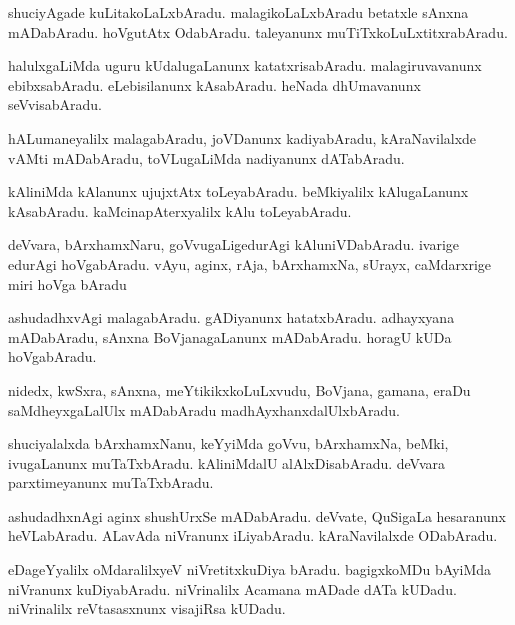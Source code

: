 \documentclass{article}
\begin{document}
\begin{mn}
shuciyAgade kuLitakoLaLxbAradu. malagikoLaLxbAradu betatxle sAnxna mADabAradu. hoVgutAtx 
OdabAradu. taleyanunx muTiTxkoLuLxtitxrabAradu.
\end{mn}

\begin{mn}
halulxgaLiMda uguru kUdalugaLanunx katatxrisabAradu. malagiruvavanunx ebibxsabAradu. 
eLebisilanunx kAsabAradu. heNada dhUmavanunx seVvisabAradu.
\end{mn}

\begin{mn}
hALumaneyalilx malagabAradu, joVDanunx kadiyabAradu, kAraNavilalxde vAMti mADabAradu, 
toVLugaLiMda nadiyanunx dATabAradu.
\end{mn}

\begin{mn}
kAliniMda kAlanunx ujujxtAtx toLeyabAradu. beMkiyalilx kAlugaLanunx kAsabAradu. 
kaMcinapAterxyalilx kAlu toLeyabAradu.
\end{mn}

\begin{mn}
deVvara, bArxhamxNaru, goVvugaLigedurAgi kAluniVDabAradu. ivarige edurAgi hoVgabAradu. vAyu, 
aginx, rAja, bArxhamxNa, sUrayx, caMdarxrige miri hoVga bAradu
\end{mn}

\begin{mn}
ashudadhxvAgi malagabAradu. gADiyanunx hatatxbAradu. adhayxyana mADabAradu, sAnxna 
BoVjanagaLanunx mADabAradu. horagU kUDa hoVgabAradu.
\end{mn}

\begin{mn}
nidedx, kwSxra, sAnxna, meYtikikxkoLuLxvudu, BoVjana, gamana, eraDu saMdheyxgaLalUlx mADabAradu 
madhAyxhanxdalUlxbAradu.
\end{mn}

\begin{mn}
shuciyalalxda bArxhamxNanu, keYyiMda goVvu, bArxhamxNa, beMki, ivugaLanunx muTaTxbAradu. 
kAliniMdalU alAlxDisabAradu. deVvara parxtimeyanunx muTaTxbAradu.
\end{mn}

\begin{mn}
ashudadhxnAgi aginx shushUrxSe mADabAradu. deVvate, QuSigaLa hesaranunx heVLabAradu. ALavAda 
niVranunx iLiyabAradu. kAraNavilalxde ODabAradu.
\end{mn}

\begin{mn}
eDageYyalilx oMdaralilxyeV niVretitxkuDiya bAradu. bagigxkoMDu bAyiMda niVranunx kuDiyabAradu. 
niVrinalilx Acamana mADade dATa kUDadu. niVrinalilx reVtasasxnunx visajiRsa kUDadu.
\end{mn}
\end{document}
